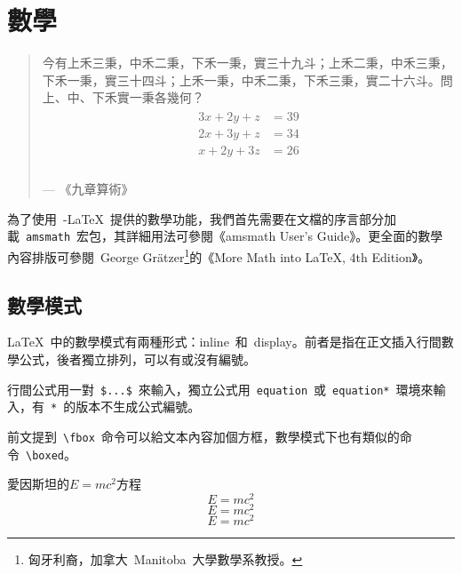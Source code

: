 \chapter{數學}

\begin{quotation}
今有上禾三秉，中禾二秉，下禾一秉，實三十九斗；上禾二秉，中禾三秉，下禾一秉，實三十四斗；上禾一秉，中禾二秉，下禾三秉，實二十六斗。問上、中、下禾實一秉各幾何？
\begin{gather*}
\begin{split}
    3x+2y+z &= 39 \\
    2x+3y+z &= 34 \\
    x+2y+3z &= 26 \\
\end{split}
\end{gather*}
\begin{flushright}
--- 《九章算術》
\end{flushright}
\end{quotation}


為了使用~\AmS-\LaTeX~提供的數學功能，我們首先需要在文檔的序言部分加載~\verb|amsmath|~宏包，其詳細用法可參閱《amsmath User's Guide》\citep{AMS_2002}。更全面的數學內容排版可參閱~George Grätzer\footnote{匈牙利裔，加拿大~Manitoba~大學數學系教授。}的《More Math into \LaTeX, 4th Edition》\citep{Gratzer_2007}。

\section{數學模式}
\LaTeX~中的數學模式有兩種形式：inline~和~display。前者是指在正文插入行間數學公式，後者獨立排列，可以有或沒有編號。

行間公式用一對~\verb|$...$|~來輸入，獨立公式用~\verb|equation|~或~\verb|equation*|~環境來輸入，有~\verb|*|~的版本不生成公式編號。

前文提到~\verb|\fbox|~命令可以給文本內容加個方框，數學模式下也有類似的命令~\verb|\boxed|。

\begin{demo}
愛因斯坦的$E=mc^2$方程
\begin{equation} 
    E=mc^2 
\end{equation}
\[ E=mc^2 \]
\[ \boxed{E=mc^2} \]
\end{demo}

